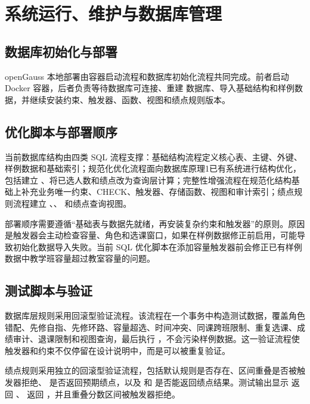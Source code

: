 \chapter{系统运行、维护与数据库管理}

\section{数据库初始化与部署}

openGauss 本地部署由容器启动流程和数据库初始化流程共同完成。前者启动 Docker 容器，后者负责等待数据库可连接、重建  数据库、导入基础结构和样例数据，并继续安装约束、触发器、函数、视图和绩点规则版本。


\section{优化脚本与部署顺序}

当前数据库结构由四类 SQL 流程支撑：基础结构流程定义核心表、主键、外键、样例数据和基础索引；规范化优化流程面向数据库原理1已有系统进行结构优化，包括建立 、将已选人数和绩点改为查询层计算；完整性增强流程在规范化结构基础上补充业务唯一约束、CHECK、触发器、存储函数、视图和审计索引；绩点规则流程建立 、、 和绩点查询视图。

部署顺序需要遵循“基础表与数据先就绪，再安装复杂约束和触发器”的原则。原因是触发器会主动检查容量、角色和选课窗口，如果在样例数据修正前启用，可能导致初始化数据导入失败。当前 SQL 优化脚本在添加容量触发器前会修正已有样例数据中教学班容量超过教室容量的问题。

\section{测试脚本与验证}

数据库层规则采用回滚型验证流程。该流程在一个事务中构造测试数据，覆盖角色错配、先修自指、先修环路、容量超选、时间冲突、同课跨班限制、重复选课、成绩审计、退课限制和视图查询，最后执行 ，不会污染样例数据。这一验证流程使触发器和约束不仅停留在设计说明中，而是可以被重复验证。

绩点规则采用独立的回滚型验证流程，包括默认规则是否存在、区间重叠是否被触发器拒绝、 是否返回预期绩点，以及  和  是否能返回绩点结果。测试输出显示  返回 、 返回 ，并且重叠分数区间被触发器拒绝。

